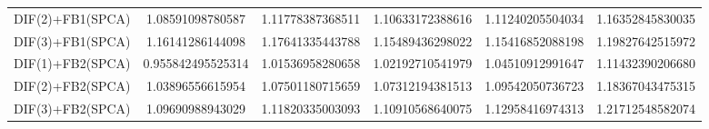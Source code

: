 \begin{table}[h]
\begin{adjustbox}{totalheight=\baselineskip}
\begin{tabular}{lSSSSS}
DIF(2)+FB1(SPCA) & 1.08591098780587 & 1.11778387368511 & 1.10633172388616 & 1.11240205504034 & 1.16352845830035 \\ 
DIF(3)+FB1(SPCA) & 1.16141286144098 & 1.17641335443788 & 1.15489436298022 & 1.15416852088198 & 1.19827642515972 \\ 
DIF(1)+FB2(SPCA) & 0.955842495525314 & 1.01536958280658 & 1.02192710541979 & 1.04510912991647 & 1.11432390206680 \\ 
DIF(2)+FB2(SPCA) & 1.03896556615954 & 1.07501180715659 & 1.07312194381513 & 1.09542050736723 & 1.18367043475315 \\ 
DIF(3)+FB2(SPCA) & 1.09690988943029 & 1.11820335003093 & 1.10910568640075 & 1.12958416974313 & 1.21712548582074 \\ \bottomrule 
\end{tabular}
\end{adjustbox}
\end{table}



